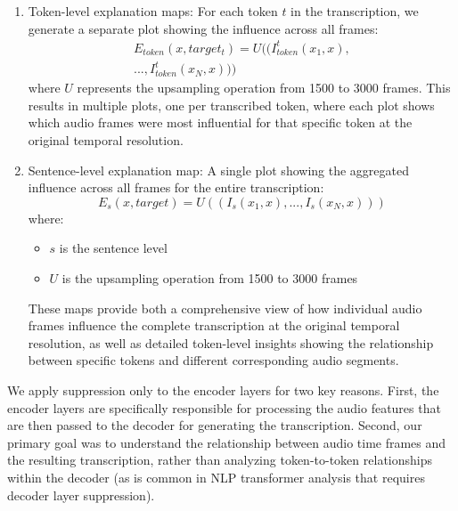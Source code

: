 \documentclass[../report.tex]{subfiles}
\begin{document}
    \begin{enumerate}
        \item Token-level explanation maps:
        For each token $t$ in the transcription, we generate a separate plot showing the influence across all frames:
        \begin{equation}
        \begin{split}
            E_{token}(x, target_t) = U((I^t_{token}(x_1, x), \\
            ..., I^t_{token}(x_N, x)))
        \end{split}
        \end{equation}
        where $U$ represents the upsampling operation from 1500 to 3000 frames. This results in multiple plots, one per transcribed token, where each plot shows which audio frames were most influential for that specific token at the original temporal resolution.

        \item Sentence-level explanation map:
        A single plot showing the aggregated influence across all frames for the entire transcription:
        \begin{equation}
            E_{s}(x, target) = U((I_{s}(x_1, x), ..., I_{s}(x_N, x)))
        \end{equation}
        where: 
        \begin{itemize}
            \item $s$ is the sentence level
            \item $U$ is the upsampling operation from 1500 to 3000 frames
        \end{itemize}
        
     These maps provide both a comprehensive view of how individual audio frames influence the complete transcription at the original temporal resolution, as well as detailed token-level insights showing the relationship between specific tokens and different corresponding audio segments.
    \end{enumerate}

    We apply suppression only to the encoder layers for two key reasons. First, the encoder layers are specifically responsible for processing the audio features that are then passed to the decoder for generating the transcription. Second, our primary goal was to understand the relationship between audio time frames and the resulting transcription, rather than analyzing token-to-token relationships within the decoder (as is common in NLP transformer analysis that requires decoder layer suppression).
\end{document}

